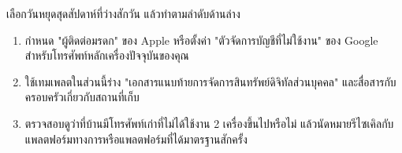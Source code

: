 \begin{tcbpractice}{เลือกวันหยุดสุดสัปดาห์ที่ว่างสักวัน แล้วทำตามลำดับด้านล่าง}
\begin{enumerate}
  \item กำหนด "ผู้ติดต่อมรดก" ของ Apple หรือตั้งค่า "ตัวจัดการบัญชีที่ไม่ใช้งาน" ของ Google สำหรับโทรศัพท์หลักเครื่องปัจจุบันของคุณ
  \item ใช้เทมเพลตในส่วนนี้ร่าง "เอกสารแนบท้ายการจัดการสินทรัพย์ดิจิทัลส่วนบุคคล" และสื่อสารกับครอบครัวเกี่ยวกับสถานที่เก็บ
  \item ตรวจสอบดูว่าที่บ้านมีโทรศัพท์เก่าที่ไม่ได้ใช้งาน 2 เครื่องขึ้นไปหรือไม่ แล้วนัดหมายรีไซเคิลกับแพลตฟอร์มทางการหรือแพลตฟอร์มที่ได้มาตรฐานสักครั้ง
\end{enumerate}

\end{tcbpractice}
